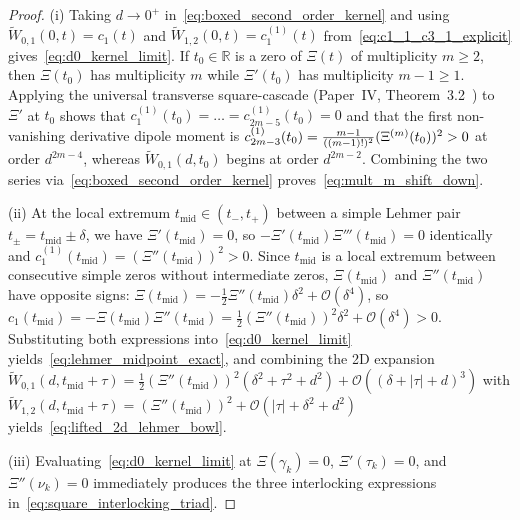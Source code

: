 \documentclass[11pt,reqno]{amsart}
\theoremstyle{definition}
\theoremstyle{remark}
\numberwithin{equation}{section}
\newcommand{\R}{\mathbb{R}}
\newcommand{\fac}{\mathclose{\mathchar"0021}}
\begin{document}
\begin{proof}
(i) Taking $d \to 0^+$ in~\eqref{eq:boxed_second_order_kernel} and using $\widetilde{W}_{0,1}(0,t) = c_1(t)$ and $\widetilde{W}_{1,2}(0,t) = c_1^{(1)}(t)$ from~\eqref{eq:c1_1_c3_1_explicit} gives~\eqref{eq:d0_kernel_limit}. If $t_0 \in \R$ is a zero of $\Xi(t)$ of multiplicity $m \ge 2$, then $\Xi(t_0)$ has multiplicity $m$ while $\Xi'(t_0)$ has multiplicity $m - 1 \ge 1$. Applying the universal transverse square-cascade (Paper~IV, Theorem~3.2~\cite{missiaen2026paper4}) to $\Xi'$ at $t_0$ shows that $c_1^{(1)}(t_0) = \dots = c_{2m-5}^{(1)}(t_0) = 0$ and that the first non-vanishing derivative dipole moment is $c_{2m-3}^{(1)}(t_0) = \frac{m-1}{((m-1)\fac)^2}(\Xi^{(m)}(t_0))^2 > 0$ at order $d^{2m-4}$, whereas $\widetilde{W}_{0,1}(d,t_0)$ begins at order $d^{2m-2}$. Combining the two series via~\eqref{eq:boxed_second_order_kernel} proves~\eqref{eq:mult_m_shift_down}.

(ii) At the local extremum $t_{\mathrm{mid}} \in (t_-, t_+)$ between a simple Lehmer pair $t_\pm = t_{\mathrm{mid}} \pm \delta$, we have $\Xi'(t_{\mathrm{mid}}) = 0$, so $-\Xi'(t_{\mathrm{mid}})\Xi'''(t_{\mathrm{mid}}) = 0$ identically and $c_1^{(1)}(t_{\mathrm{mid}}) = (\Xi''(t_{\mathrm{mid}}))^2 > 0$. Since $t_{\mathrm{mid}}$ is a local extremum between consecutive simple zeros without intermediate zeros, $\Xi(t_{\mathrm{mid}})$ and $\Xi''(t_{\mathrm{mid}})$ have opposite signs: $\Xi(t_{\mathrm{mid}}) = -\frac{1}{2}\Xi''(t_{\mathrm{mid}})\delta^2 + \mathcal{O}(\delta^4)$, so $c_1(t_{\mathrm{mid}}) = -\Xi(t_{\mathrm{mid}})\Xi''(t_{\mathrm{mid}}) = \frac{1}{2}(\Xi''(t_{\mathrm{mid}}))^2\delta^2 + \mathcal{O}(\delta^4) > 0$. Substituting both expressions into~\eqref{eq:d0_kernel_limit} yields~\eqref{eq:lehmer_midpoint_exact}, and combining the 2D expansion $\widetilde{W}_{0,1}(d, t_{\mathrm{mid}}+\tau) = \frac{1}{2}(\Xi''(t_{\mathrm{mid}}))^2(\delta^2 + \tau^2 + d^2) + \mathcal{O}((\delta+|\tau|+d)^3)$ with $\widetilde{W}_{1,2}(d, t_{\mathrm{mid}}+\tau) = (\Xi''(t_{\mathrm{mid}}))^2 + \mathcal{O}(|\tau| + \delta^2 + d^2)$ yields~\eqref{eq:lifted_2d_lehmer_bowl}.

(iii) Evaluating~\eqref{eq:d0_kernel_limit} at $\Xi(\gamma_k) = 0$, $\Xi'(\tau_k) = 0$, and $\Xi''(\nu_k) = 0$ immediately produces the three interlocking expressions in~\eqref{eq:square_interlocking_triad}.
\end{proof}
\end{document}
